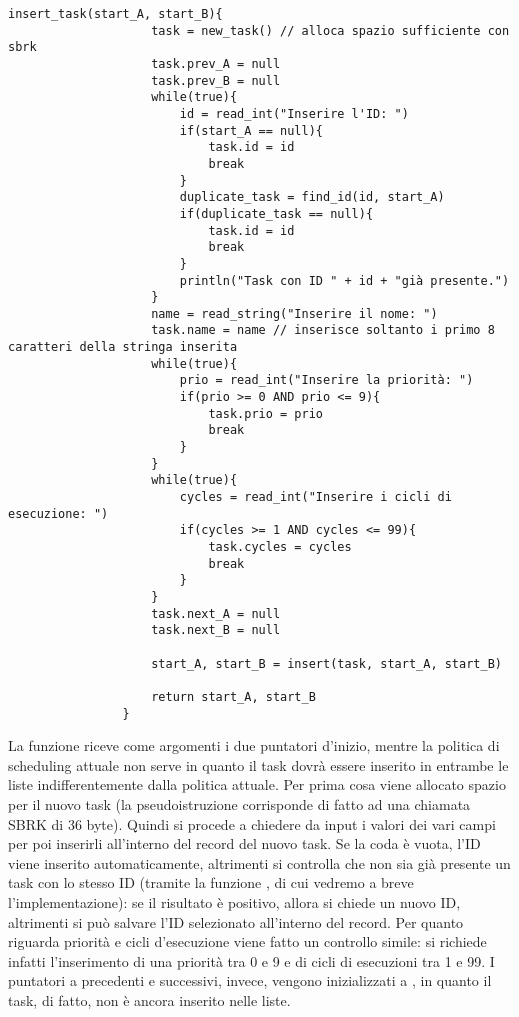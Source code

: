         \begin{center}
           	\begin{lstlisting}[language=pseudo, gobble=14]
                insert_task(start_A, start_B){
                    task = new_task() // alloca spazio sufficiente con sbrk
                    task.prev_A = null
                    task.prev_B = null
                    while(true){
                        id = read_int("Inserire l'ID: ")
                        if(start_A == null){
                            task.id = id
                            break
                        }
                        duplicate_task = find_id(id, start_A)
                        if(duplicate_task == null){
                            task.id = id
                            break
                        }
                        println("Task con ID " + id + "già presente.")
                    }
                    name = read_string("Inserire il nome: ")
                    task.name = name // inserisce soltanto i primo 8 caratteri della stringa inserita
                    while(true){
                        prio = read_int("Inserire la priorità: ")
                        if(prio >= 0 AND prio <= 9){
                            task.prio = prio
                            break
                        }
                    }
                    while(true){
                        cycles = read_int("Inserire i cicli di esecuzione: ")
                        if(cycles >= 1 AND cycles <= 99){
                            task.cycles = cycles
                            break
                        }
                    }
                    task.next_A = null
                    task.next_B = null
                    
                    start_A, start_B = insert(task, start_A, start_B)
                    
                    return start_A, start_B
                }\end{lstlisting}
        \end{center}
        
        La funzione  riceve come argomenti i due puntatori d'inizio, mentre la politica di scheduling attuale non serve in quanto il task dovrà essere inserito in entrambe le liste indifferentemente dalla politica attuale. Per prima cosa viene allocato spazio per il nuovo task (la pseudoistruzione  corrisponde di fatto ad una chiamata SBRK di 36 byte). Quindi si procede a chiedere da input i valori dei vari campi per poi inserirli all'interno del record del nuovo task. Se la coda è vuota, l'ID viene inserito automaticamente, altrimenti si controlla che non sia già presente un task con lo stesso ID (tramite la funzione , di cui vedremo a breve l'implementazione): se il risultato è positivo, allora si chiede un nuovo ID, altrimenti si può salvare l'ID selezionato all'interno del record. Per quanto riguarda priorità e cicli d'esecuzione viene fatto un controllo simile: si richiede infatti l'inserimento di una priorità tra 0 e 9 e di cicli di esecuzioni tra 1 e 99. I puntatori a precedenti e successivi, invece, vengono inizializzati a , in quanto il task, di fatto, non è ancora inserito nelle liste.
        
